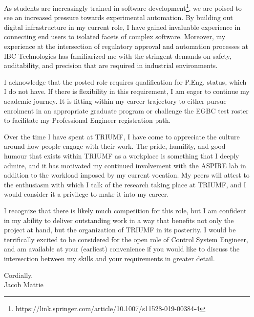 \documentclass[a4paper,10pt]{article}
\begin{document}
\vspace{0.5em}

As students are increasingly trained in software development\footnote{https://link.springer.com/article/10.1007/s11528-019-00384-4}, we are poised to see an increased pressure towards experimental automation. By building out digital infrastructure in my current role, I have gained invaluable experience in connecting end users to isolated facets of complex software. Moreover, my experience at the intersection of regulatory approval and automation processes at IBC Technologies has familiarized me with the stringent demands on safety, auditability, and precision that are required in industrial environments.

\vspace{0.5em}

I acknowledge that the posted role requires qualification for P.Eng. status, which I do not have. If there is flexibility in this requirement, I am eager to continue my academic journey. It is fitting within my career trajectory to either pursue enrolment in an appropriate graduate program or challenge the EGBC test roster to facilitate my Professional Engineer registration path. 

\vspace{0.5em}

Over the time I have spent at TRIUMF, I have come to appreciate the culture around how people engage with their work. The pride, humility, and good humour that exists within TRIUMF as a workplace is something that I deeply admire, and it has motivated my continued involvement with the ASPIRE lab in addition to the workload imposed by my current vocation. My peers will attest to the enthusiasm with which I talk of the research taking place at TRIUMF, and I would consider it a privilege to make it into my career.

\vspace{0.5em}

I recognize that there is likely much competition for this role, but I am confident in my ability to deliver outstanding work in a way that benefits not only the project at hand, but the organization of TRIUMF in its posterity. I would be terrifically excited to be considered for the open role of Control System Engineer, and am available at your (earliest) convenience if you would like to discuss the intersection between my skills and your requirements in greater detail.


\vspace{1em}


\vspace{2em}
Cordially,\\

\vspace{2em}
Jacob Mattie
\end{document}
